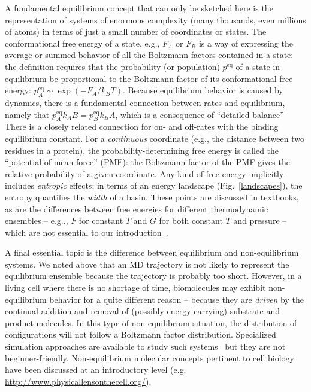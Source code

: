 \documentclass[9pt,bestpractices]{livecoms}
\newcommand{\peq}{p^{\mathrm{eq}}}
\begin{document}
A fundamental equilibrium concept that can only be sketched here is the representation of systems of enormous complexity (many thousands, even millions of atoms) in terms of just a small number of coordinates or states.  
The conformational free energy of a state, e.g., $F_A$ or $F_B$ is a way of expressing the average or summed behavior of all the Boltzmann factors contained in a state: the definition requires that the probability (or population) $\peq$ of a state in equilibrium be proportional to the Boltzmann factor of its conformational free energy: $\peq_A \sim \exp(-F_A/k_BT)$.  
Because equilibrium behavior is caused by dynamics, there is a fundamental connection between rates and equilibrium, namely that $\peq_A k_AB = \peq_B k_BA$, which is a consequence of ``detailed balance''
There is a closely related connection for on- and off-rates with the binding equilibrium constant.  
For a \emph{continuous} coordinate (e.g., the distance between two residues in a protein), the probability-determining free energy is called the “potential of mean force” (PMF): the Boltzmann factor of the PMF gives the relative probability of a given coordinate.  
Any kind of free energy implicitly includes \emph{entropic} effects; in terms of an energy landscape (Fig.\ \ref{landscapes}), the entropy quantifies the \emph{width} of a basin.  
These points are discussed in textbooks, as are the differences between free energies for different thermodynamic ensembles -- e.g.., $F$ for constant $T$ and $G$ for both constant $T$ and pressure -- which are not essential to our introduction~\cite{DillBook, Zuckerman:2010:}.

A final essential topic is the difference between equilibrium and non-equilibrium systems.  
We noted above that an MD trajectory is not likely to represent the equilibrium ensemble because the trajectory is probably too short.  
However, in a living cell where there is no shortage of time, biomolecules may exhibit non-equilibrium behavior for a quite different reason -- because they are \emph{driven} by the continual addition and removal of (possibly energy-carrying) substrate and product molecules.  
In this type of non-equilibrium situation, the distribution of configurations will not follow a Boltzmann factor distribution.  
Specialized simulation approaches are available to study such systems~\cite{Chong:2017:CurrentOpinioninStructuralBiology,  Zuckerman:2017:Annu.Rev.Biophys.} but they are not beginner-friendly.  
Non-equilibrium molecular concepts pertinent to cell biology have been discussed at an introductory level (e.g. \url{http://www.physicallensonthecell.org/}).
\end{document}
